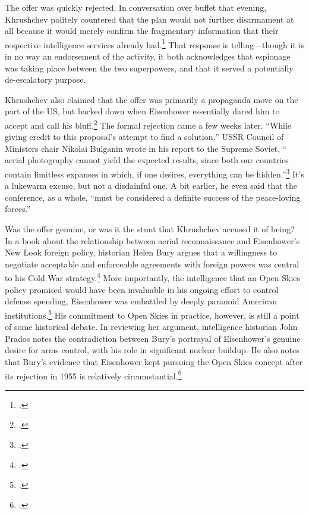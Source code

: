 \documentclass{report}
\begin{document}
\begin{refsegment}
The offer was quickly rejected. In conversation over buffet that evening, Khrushchev politely countered that the plan would not further disarmament at all because it would merely confirm the fragmentary information that their respective intelligence services already had.\footcite{department_of_state_memorandum_1955} That response is telling---though it is in no way an endorsement of the activity, it both acknowledges that espionage was taking place between the two superpowers, and that it served a potentially de-escalatory purpose.

Khrushchev also claimed that the offer was primarily a propaganda move on the part of the US, but backed down when Eisenhower essentially dared him to accept and call his bluff.\footcite[p.~2. This is a secondary source---the book cites a conversation by Eisenhower, quoted in NSC meeting memos that are stored in the Eisenhower library.]{bury_eisenhower_2014} The formal rejection came a few weeks later. ``While giving credit to this proposal's attempt to find a solution,'' USSR Council of Ministers chair Nikolai Bulganin wrote in his report to the Supreme Soviet, ``\textelp{} aerial photography cannot yield the expected results, since both our countries contain limitless expanses in which, if one desires, everything can be hidden.''\footcite{bulganin_meetings_1955} It's a lukewarm excuse, but not a disdainful one. A bit earlier, he even said that the conference, as a whole, ``must be considered a definite success of the peace-loving forces.''

Was the offer genuine, or was it the stunt that Khrushchev accused it of being? In a book about the relationship between aerial reconnaissance and Eisenhower's New Look foreign policy, historian Helen Bury argues that a willingness to negotiate acceptable and enforceable agreements with foreign powers was central to his Cold War strategy.\footcite[p.~69]{bury_eisenhower_2014} More importantly, the intelligence that an Open Skies policy promised would have been invaluable in his ongoing effort to control defense spending, Eisenhower was embattled by deeply paranoid American institutions.\footcite[p.~212]{bury_eisenhower_2014} His commitment to Open Skies in practice, however, is still a point of some historical debate. In reviewing her argument, intelligence historian John Prados notes the contradiction between Bury's portrayal of Eisenhower's genuine desire for arms control, with his role in significant nuclear buildup. He also notes that Bury's evidence that Eisenhower kept pursuing the Open Skies concept after its rejection in 1955 is relatively circumstantial.\footcite[p.~233-234]{prados_review_2015}


\end{refsegment}
\end{document}
